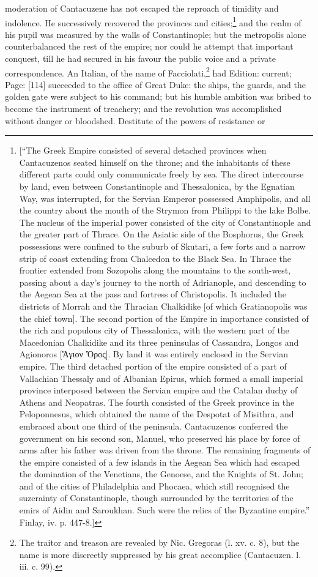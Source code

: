 moderation of Cantacuzene has not escaped the reproach of timidity and indolence. He successively recovered the provinces and cities;\footnote{[\texthebrew{“}The Greek Empire consisted of several detached provinces when Cantacuzenos seated himself on the throne; and the inhabitants of these different parts could only communicate freely by sea. The direct intercourse by land, even between Constantinople and Thessalonica, by the Egnatian Way, was interrupted, for the Servian Emperor possessed Amphipolis, and all the country about the mouth of the Strymon from Philippi to the lake Bolbe. The nucleus of the imperial power consisted of the city of Constantinople and the greater part of Thrace. On the Asiatic side of the Bosphorus, the Greek possessions were confined to the suburb of Skutari, a few forts and a narrow strip of coast extending from Chalcedon to the Black Sea. In Thrace the frontier extended from Sozopolis along the mountains to the south-west, passing about a day\texthebrew{}’s journey to the north of Adrianople, and descending to the Aegean Sea at the pass and fortress of Christopolis. It included the districts of Morrah and the Thracian Chalkidike [of which Gratianopolis was the chief town]. The second portion of the Empire in importance consisted of the rich and populous city of Thessalonica, with the western part of the Macedonian Chalkidike and its three peninsulas of Cassandra, Longos and Agionoros [\textgreek{\texthebrew{Ἅ}γιον \texthebrew{Ὄ}ρος}]. By land it was entirely enclosed in the Servian empire. The third detached portion of the empire consisted of a part of Vallachian Thessaly and of Albanian Epirus, which formed a small imperial province interposed between the Servian empire and the Catalan duchy of Athens and Neopatras. The fourth consisted of the Greek province in the Peloponnesus, which obtained the name of the Despotat of Misithra, and embraced about one third of the peninsula. Cantacuzenos conferred the government on his second son, Manuel, who preserved his place by force of arms after his father was driven from the throne. The remaining fragments of the empire consisted of a few islands in the Aegean Sea which had escaped the domination of the Venetians, the Genoese, and the Knights of St. John; and of the cities of Philadelphia and Phocaea, which still recognised the suzerainty of Constantinople, though surrounded by the territories of the emirs of Aidin and Saroukhan. Such were the relics of the Byzantine empire.\texthebrew{}” Finlay, iv. p. 447-8.]} and the realm of his pupil was measured by the walls of Constantinople; but the metropolis alone counterbalanced the rest of the empire; nor could he attempt that important conquest, till he had secured in his favour the public voice and a private correspondence. An Italian, of the name of Facciolati,\footnote{The traitor and treason are revealed by Nic. Gregoras (l. xv. c. 8), but the name is more discreetly suppressed by his great accomplice (Cantacuzen. l. iii. c. 99).} had Edition: current; Page: [114] succeeded to the office of Great Duke: the ships, the guards, and the golden gate were subject to his command; but his humble ambition was bribed to become the instrument of treachery; and the revolution was accomplished without danger or bloodshed. Destitute of the powers of resistance or 
